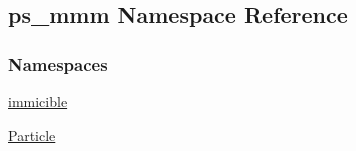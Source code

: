 \hypertarget{namespaceps__mmm}{}\subsection{ps\+\_\+mmm Namespace Reference}
\label{namespaceps__mmm}
\subsubsection*{Namespaces}
\begin{DoxyCompactItemize}
\item 
 \hyperlink{namespaceps__mmm_1_1immicible}{immicible}
\item 
 \hyperlink{namespaceps__mmm_1_1_particle}{Particle}
\end{DoxyCompactItemize}
